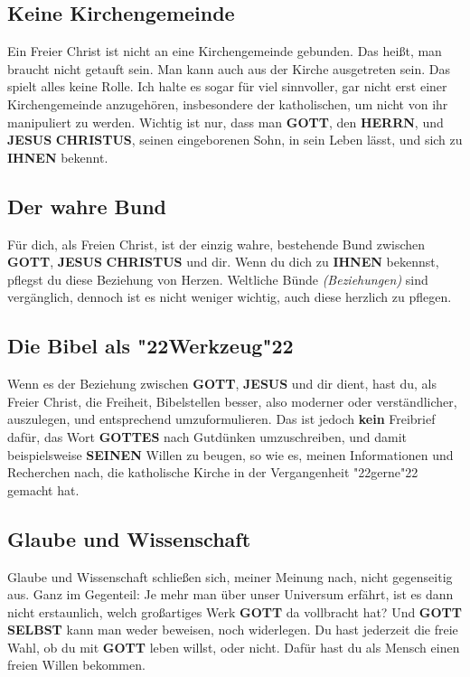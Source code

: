 \documentclass[10pt,a5paper]{article}
\newcommand{\Christus}[0]{\textbf{CHRISTUS}}
\newcommand{\Gottes}[0]{\textbf{GOTTES}}
\newcommand{\Gott}[0]{\textbf{GOTT}}
\newcommand{\Herrn}[0]{\textbf{HERRN}}
\newcommand{\Ihnen}[0]{\textbf{IHNEN}}
\newcommand{\Jesus}[0]{\textbf{JESUS}}
\newcommand{\Seinen}[0]{\textbf{SEINEN}}
\newcommand{\Selbst}[0]{\textbf{SELBST}}
\newcommand{\q}[1]{\char"22{#1}\char"22 }
\begin{document}
	\subsection{Keine Kirchengemeinde}
		Ein Freier Christ ist nicht an eine Kirchengemeinde gebunden.
		Das hei{\ss}t,
		man braucht nicht getauft sein.
		Man kann auch aus der Kirche ausgetreten sein.
		Das spielt alles keine Rolle.
		Ich halte es sogar f\"ur viel sinnvoller,
		gar nicht erst einer Kirchengemeinde anzugeh\"oren,
		insbesondere der katholischen,
		um nicht von ihr manipuliert zu werden.
		Wichtig ist nur,
		dass man {\Gott},
		den {\Herrn},
		und {\Jesus} {\Christus},
		seinen eingeborenen Sohn,
		in sein Leben l\"asst,
		und sich zu {\Ihnen} bekennt.
	
	\subsection{Der wahre Bund}
		F\"ur dich,
		als Freien Christ,
		ist der einzig wahre,
		bestehende Bund zwischen {\Gott},
		{\Jesus} {\Christus} und dir.
		Wenn du dich zu {\Ihnen} bekennst,
		pflegst du diese Beziehung von Herzen.
		Weltliche B\"unde \textit{(Beziehungen)} sind verg\"anglich,
		dennoch ist es nicht weniger wichtig,
		auch diese herzlich zu pflegen.
	
	\subsection{Die Bibel als \q{Werkzeug}}
		Wenn es der Beziehung zwischen {\Gott},
		{\Jesus} und dir dient,
		hast du,
		als Freier Christ,
		die Freiheit,
		Bibelstellen besser,
		also moderner oder verst\"andlicher,
		auszulegen,
		und entsprechend umzuformulieren.
		Das ist jedoch \textbf{kein} Freibrief daf\"ur,
		das Wort {\Gottes} nach Gutdünken umzuschreiben,
		und damit beispielsweise {\Seinen} Willen zu beugen,
		so wie es,
		meinen Informationen und Recherchen nach,
		die katholische Kirche in der Vergangenheit \q{gerne} gemacht hat.
	
	\subsection{Glaube und Wissenschaft}
		Glaube und Wissenschaft schlie{\ss}en sich,
		meiner Meinung nach,
		nicht gegenseitig aus.
		Ganz im Gegenteil:
		Je mehr man \"uber unser Universum erf\"ahrt,
		ist es dann nicht erstaunlich,
		welch gro{\ss}artiges Werk {\Gott} da vollbracht hat?
		Und {\Gott} {\Selbst} kann man weder beweisen,
		noch widerlegen.
		Du hast jederzeit die freie Wahl,
		ob du mit {\Gott} leben willst,
		oder nicht.
		Daf\"ur hast du als Mensch einen freien Willen bekommen.
	
\end{document}

